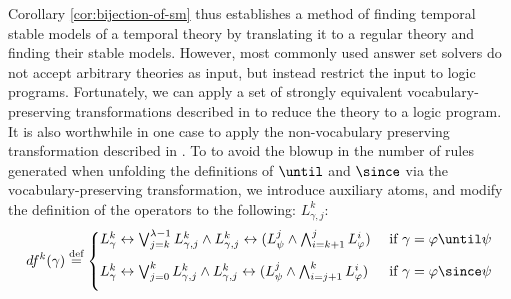 Corollary \ref{cor:bijection-of-sm} thus establishes a method of
finding temporal stable models of a temporal theory by translating it
to a regular theory and finding their stable models. However, most
commonly used answer set solvers do not accept arbitrary theories as
input, but instead restrict the input to logic programs. Fortunately,
we can apply a set of strongly equivalent vocabulary-preserving
transformations described in \cite{capeva05a} to reduce the theory to
a logic program. It is also worthwhile in one case to apply the
non-vocabulary preserving transformation described in
\cite{capeva05a}. To to avoid the blowup in the number of rules
generated when unfolding the definitions of $\until$ and $\since$ via
the vocabulary-preserving transformation, we introduce auxiliary
atoms, and modify the definition of the operators to the following:
$L_{\gamma,j}^k$:
\begin{align*}
df^k(\gamma) \defeq \begin{cases}
  L^k_{\gamma} \leftrightarrow \bigvee_{j=k}^{\lambda-1}L_{\gamma,j}^k \wedge L_{\gamma,j}^k \leftrightarrow 
(L_\psi^j \wedge \bigwedge_{i=k+1}^{j}L_{\varphi}^i)
  &\text{ if } \gamma = \varphi \until \psi \\[2ex]
  L^k_{\gamma} \leftrightarrow  \bigvee_{j=0}^{k} L_{\gamma,j}^k \wedge L_{\gamma,j}^k \leftrightarrow (L_\psi^j \wedge \bigwedge_{i=j+1}^{k}L_{\varphi}^i)
  &\text{ if } \gamma = \varphi \since \psi \\[2ex]
\end{cases}
\end{align*}